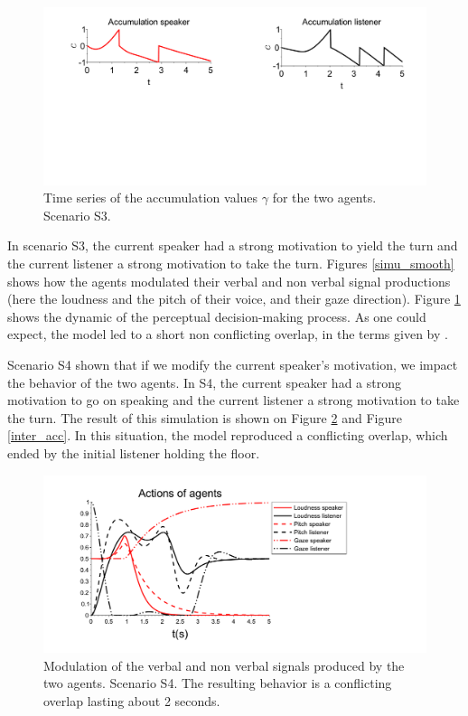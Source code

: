 \begin{figure}[t]
  \centering
  \includegraphics[width=\linewidth]{figure/smooth-transition_accumulation_small.pdf}
  \caption{Time series of the accumulation values $\gamma$ for the two agents. Scenario S3.}
  \label{smooth_acc}
\end{figure}


In scenario S3, the current speaker had a strong motivation to yield the turn and the current listener a strong motivation to take the turn. Figures \ref{simu_smooth} shows how the agents modulated their verbal and non verbal signal productions (here the loudness and the pitch of their voice, and their gaze direction). Figure \ref{smooth_acc} shows the dynamic of the perceptual decision-making process. As one could expect, the model led to a short non conflicting overlap, in the terms given by \citep{schegloff_overlapping_2000}. 

Scenario S4 shown that if we modify the current speaker's motivation, we impact the behavior of the two agents. In S4, the current speaker had a strong motivation to go on speaking and the current listener a strong motivation to take the turn. The result of this simulation is shown on Figure \ref{simu_interruption} and  Figure \ref{inter_acc}. In this situation, the model reproduced a conflicting overlap, which ended by the initial listener holding the floor.  

\begin{figure}
  \centering
  \includegraphics[width=\linewidth]{figure/emerg_sc1.pdf}
  \caption{Modulation of the verbal and non verbal signals produced by the two agents. Scenario S4. The resulting behavior is a conflicting overlap lasting about 2 seconds.}
  \label{simu_interruption}
\end{figure}

